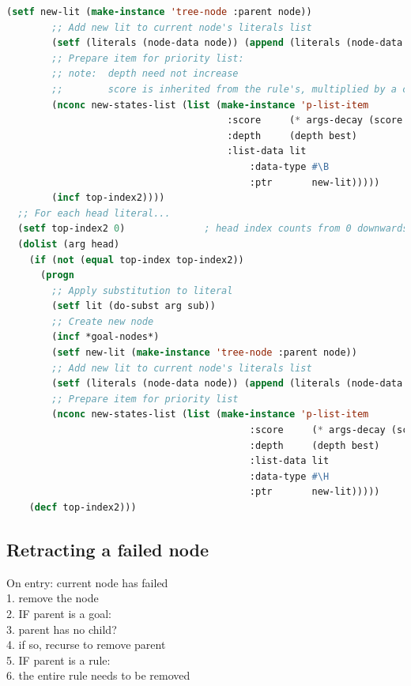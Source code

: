 \begin{lstlisting}[language=Lisp]
        (setf new-lit (make-instance 'tree-node :parent node))
        ;; Add new lit to current node's literals list
        (setf (literals (node-data node)) (append (literals (node-data node)) (list new-lit)))
        ;; Prepare item for priority list:
        ;; note:  depth need not increase
        ;;        score is inherited from the rule's, multiplied by a consecutive decay factor
        (nconc new-states-list (list (make-instance 'p-list-item
                                       :score     (* args-decay (score best))
                                       :depth     (depth best)
                                       :list-data lit
                                           :data-type #\B               ; #\B = body literal
                                           :ptr       new-lit)))))
        (incf top-index2))))
  ;; For each head literal...
  (setf top-index2 0)              ; head index counts from 0 downwards
  (dolist (arg head)
    (if (not (equal top-index top-index2))
      (progn
        ;; Apply substitution to literal
        (setf lit (do-subst arg sub))
        ;; Create new node
        (incf *goal-nodes*)
        (setf new-lit (make-instance 'tree-node :parent node))
        ;; Add new lit to current node's literals list
        (setf (literals (node-data node)) (append (literals (node-data node)) (list new-lit)))
        ;; Prepare item for priority list
        (nconc new-states-list (list (make-instance 'p-list-item
                                           :score     (* args-decay (score best))
                                           :depth     (depth best)
                                           :list-data lit
                                           :data-type #\H               ; #\H = head literal
                                           :ptr       new-lit)))))
    (decf top-index2)))
\end{lstlisting}

\subsection{Retracting a failed node}

On entry: current node has failed\\
1. remove the node\\
2. IF parent is a goal:\\
3.     parent has no child?\\
4.     if so, recurse to remove parent\\
5. IF parent is a rule:\\
6.     the entire rule needs to be removed

